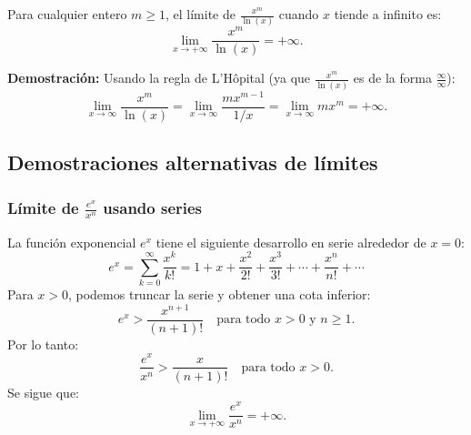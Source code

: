 \documentclass[12pt, a4paper]{article}
\theoremstyle{rioplatense}
\begin{document}
Para cualquier entero \( m \geq 1 \), el límite de \( \frac{x^m}{\ln(x)} \) cuando \( x \) tiende a infinito es:
\[
\lim_{x \to +\infty} \frac{x^m}{\ln(x)} = +\infty.
\]


\begin{flushleft}
\textbf{Demostración:}
Usando la regla de L'Hôpital (ya que \( \frac{x^m}{\ln(x)} \) es de la forma \( \frac{\infty}{\infty} \)):
\[
\lim_{x \to \infty} \frac{x^m}{\ln(x)} = \lim_{x \to \infty} \frac{m x^{m-1}}{1/x} = \lim_{x \to \infty} m x^m = +\infty.
\]
\end{flushleft}

\begin{center}
\end{center}

\subsection{Demostraciones alternativas de límites}

\subsubsection{Límite de \( \frac{e^x}{x^n} \) usando series}

La función exponencial \( e^x \) tiene el siguiente desarrollo en serie alrededor de \( x = 0 \):
\[
e^x = \sum_{k=0}^\infty \frac{x^k}{k!} = 1 + x + \frac{x^2}{2!} + \frac{x^3}{3!} + \cdots + \frac{x^n}{n!} + \cdots
\]
Para \( x > 0 \), podemos truncar la serie y obtener una cota inferior:
\[
e^x > \frac{x^{n+1}}{(n+1)!} \quad \text{para todo } x > 0 \text{ y } n \geq 1.
\]
Por lo tanto:
\[
\frac{e^x}{x^n} > \frac{x}{{(n+1)}!} \quad \text{para todo } x > 0.
\]
Se sigue que:
\[
\lim_{x \to +\infty} \frac{e^x}{x^n} = +\infty.
\]
\end{document}
